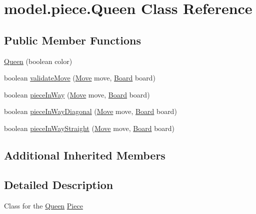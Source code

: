\hypertarget{classmodel_1_1piece_1_1_queen}{\section{model.\-piece.\-Queen Class Reference}
\label{classmodel_1_1piece_1_1_queen}
}
\subsection*{Public Member Functions}
\begin{DoxyCompactItemize}
\item 
\hyperlink{classmodel_1_1piece_1_1_queen_a51e77e8c3636697d0f140e2b210b8523}{Queen} (boolean color)
\item 
boolean \hyperlink{classmodel_1_1piece_1_1_queen_a2f074bb8d91720315e9a91eeb51dda39}{validate\-Move} (\hyperlink{classmodel_1_1_move}{Move} move, \hyperlink{classmodel_1_1board_1_1_board}{Board} board)
\item 
boolean \hyperlink{classmodel_1_1piece_1_1_queen_a24af88436f5a433f5bf1407b96b8a31a}{piece\-In\-Way} (\hyperlink{classmodel_1_1_move}{Move} move, \hyperlink{classmodel_1_1board_1_1_board}{Board} board)
\item 
boolean \hyperlink{classmodel_1_1piece_1_1_queen_aa1da81b8f3afff28f2b643f66b7a44ea}{piece\-In\-Way\-Diagonal} (\hyperlink{classmodel_1_1_move}{Move} move, \hyperlink{classmodel_1_1board_1_1_board}{Board} board)
\item 
boolean \hyperlink{classmodel_1_1piece_1_1_queen_a68782e144c87f3f22127caff20534cf5}{piece\-In\-Way\-Straight} (\hyperlink{classmodel_1_1_move}{Move} move, \hyperlink{classmodel_1_1board_1_1_board}{Board} board)
\end{DoxyCompactItemize}
\subsection*{Additional Inherited Members}


\subsection{Detailed Description}
Class for the \hyperlink{classmodel_1_1piece_1_1_queen}{Queen} \hyperlink{classmodel_1_1piece_1_1_piece}{Piece} 

